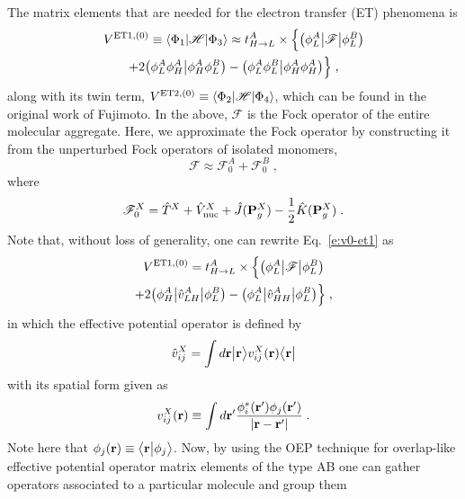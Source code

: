The matrix elements that are needed for the electron transfer (ET) phenomena
is
%
\begin{multline}\label{e:v0-et1}
 V^{{\rm ET1},(0)} \equiv \left< \Phi_1 \vert \mathscr{H} \vert \Phi_3 \right> \approx 
 t_{H\rightarrow L}^A \times \Big\{ 
 \big( \phi_L^A \big| \mathscr{F} \big| \phi_L^B \big) \\
   + 2 \big( \phi_L^A \phi_H^A \big| \phi_H^A \phi_L^B \big) - \big( \phi_L^A \phi_L^B \big| \phi_H^A \phi_H^A \big) 
 \Big\} \;,
\end{multline}
%
along with its twin term, $V^{{\rm ET2},(0)} \equiv \left< \Phi_2 \vert \mathscr{H} \vert \Phi_4 \right>$,
which can be found in the original work of Fujimoto.
In the above, $\mathscr{F}$ is the Fock operator of the entire molecular aggregate.
Here, we approximate the Fock operator by constructing it from the unperturbed
Fock operators of isolated monomers,
%
\begin{equation}
 \mathscr{F} \approx \mathscr{F}^{A}_0 + \mathscr{F}^{B}_0 \;,
\end{equation}
%
where
%
\begin{equation}
 \mathscr{F}^{X}_0 = \hat{T}^{X} + \hat{V}^{X}_{\rm nuc} + \hat{J}({\bf P}^{X}_g) - \frac{1}{2} \hat{K}({\bf P}^{X}_g) \;.
\end{equation}
%
Note that, without loss of generality, one can rewrite Eq.~\eqref{e:v0-et1}
as
%
\begin{multline}
 V^{{\rm ET1},(0)} = t_{H\rightarrow L}^A \times \Big\{ 
 \tbraket{\phi_L^A}{\mathscr{F}}{\phi_L^B} \\
  + 2 \tbraket{\phi_H^A}{\hat{v}_{LH}^A}{\phi_L^B}
  -   \tbraket{\phi_L^A}{\hat{v}_{HH}^A}{\phi_L^B}
 \Big\} \;,
\end{multline}
%
in which the effective potential operator\cite{Blasiak.Bednarska.Choluj.Bartkowiak.XXXX} is defined by
%
\begin{equation}
 \hat{v}_{ij}^X = \int d{\bf r} \Ket{{\bf r}} v_{ij}^X({\bf r})
 \Bra{{\bf r}}
\end{equation}
%
with its spatial form given as
%
\begin{equation}
 v_{ij}^X({\bf r}) \equiv \int d{\bf r}' \frac{\phi_i^*({\bf r}') \phi_j({\bf r}') }{\vert {\bf r} - {\bf r}'\vert} \;.
\end{equation}
%
Note here that $\phi_j({\bf r}) \equiv \BraKet{{\bf r}}{\phi_j}$.
Now, 
by using the OEP technique\cite{Blasiak.Bednarska.Choluj.Bartkowiak.XXXX}
for overlap\hyp{}like effective potential operator matrix elements of the type AB
one can gather operators associated to a particular molecule and group them
